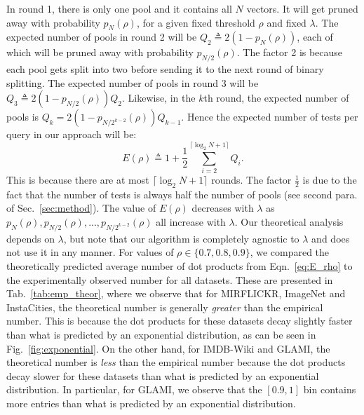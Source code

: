 \documentclass[sigconf, anonymous, review]{acmart}
\begin{document}
In round 1, there is only one pool and it contains all $N$ vectors. It will get pruned away with probability $p_N(\rho)$, for a given fixed threshold $\rho$ and fixed $\lambda$. The expected number of pools in round 2 will be $Q_2 \triangleq 2(1-p_N(\rho))$, each of which will be pruned away with probability $p_{N/2}(\rho)$. The factor 2 is because each pool gets split into two before sending it to the next round of binary splitting. The expected number of pools in round 3 will be $Q_3 \triangleq 2(1-p_{N/2}(\rho))Q_2$. Likewise, in the $k$th round, the expected number of pools is $Q_k = 2(1-p_{N/2^{k-2}}(\rho))Q_{k-1}$. Hence the expected number of tests per query in our approach will be:
\begin{equation}
E(\rho) \triangleq 1+\frac{1}{2}\sum\limits_{i=2}^{\lceil \log_2 N +1 \rceil} Q_i.
\label{eq:E_rho}
\end{equation}
This is because there are at most $\lceil \log_2 N +1 \rceil$ rounds. The factor $\frac{1}{2}$ is due to the fact that the number of tests is always half the number of pools (see second para. of Sec.~\ref{sec:method}).
The value of $E(\rho)$ decreases with $\lambda$ as $p_N(\rho), p_{N/2}(\rho),...,p_{N/2^{k-2}}(\rho)$ all increase with $\lambda$. Our theoretical analysis depends on $\lambda$, but note that our algorithm is completely agnostic to $\lambda$ and does not use it in any manner. For values of $\rho \in \{0.7,0.8,0.9\}$, we compared the theoretically predicted average number of dot products from Eqn.~\ref{eq:E_rho} to the experimentally observed number for all datasets. These are presented in Tab.~\ref{tab:emp_theor}, where we observe that for \textsf{MIRFLICKR}, \textsf{ImageNet} and \textsf{InstaCities}, the theoretical number is generally \emph{greater} than the empirical number. This is because the dot products for these datasets decay slightly faster than what is predicted by an exponential distribution, as can be seen in Fig.~\ref{fig:exponential}. On the other hand, for \textsf{IMDB-Wiki} and \textsf{GLAMI}, the theoretical number is \emph{less} than the empirical number because the dot products decay slower for these datasets than what is predicted by an exponential distribution. In particular, for \textsf{GLAMI}, we observe that the $[0.9,1]$ bin contains more entries than what is predicted by an exponential distribution. 
\end{document}
